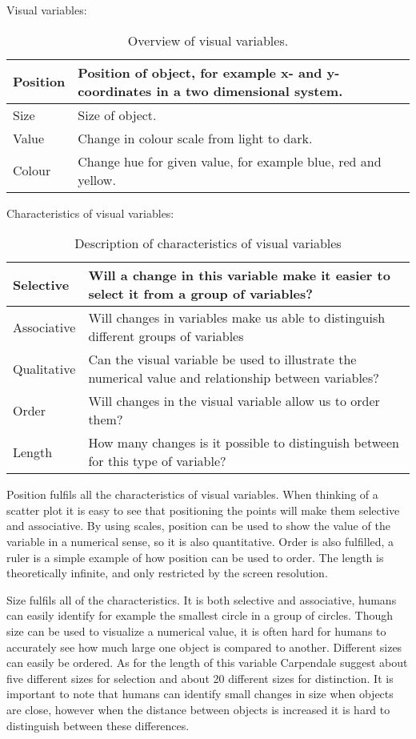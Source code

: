 Visual variables:
\begin{table}[h!]
    \begin{tabular}{|l|p{10cm}|}
        \hline
        Position    & Position of object, for example x- and y-coordinates in a two dimensional system. \\ \hline
        Size        & Size of object. \\ \hline
        Value       & Change in colour scale from light to dark. \\ \hline
        Colour      & Change hue for given value, for example blue, red and yellow. \\ \hline
    \end{tabular}
    \caption{Overview of visual variables.}
\end{table}

Characteristics of visual variables:
\begin{table}[h!]
    \begin{tabular}{|l|p{10cm}|}
        \hline
        Selective   & Will a change in this variable make it easier to select it from a group of variables? \\ \hline
        Associative & Will changes in variables make us able to distinguish different groups of variables \\ \hline 
        Qualitative & Can the visual variable be used to illustrate the numerical value and relationship between variables? \\ \hline
        Order       & Will changes in the visual variable allow us to order them? \\ \hline
        Length      & How many changes is it possible to distinguish between for this type of variable? \\ \hline
    \end{tabular}
    \caption{Description of characteristics of visual variables}
\end{table}

Position fulfils all the characteristics of visual variables. When thinking of a scatter plot it is easy to see that positioning the points will make them selective and associative. By using scales, position can be used to show the value of the variable in a numerical sense, so it is also quantitative. Order is also fulfilled, a ruler is a simple example of how position can be used to order. The length is theoretically infinite, and only restricted by the screen resolution.

Size fulfils all of the characteristics. It is both selective and associative, humans can easily identify for example the smallest circle in a group of circles. Though size can be used to visualize a numerical value, it is often hard for humans to accurately see how much large one object is compared to another. Different sizes can easily be ordered. As for the length of this variable Carpendale suggest about five different sizes for selection and about 20 different sizes for distinction. It is important to note that humans can identify small changes in size when objects are close, however when the distance between objects is increased it is hard to distinguish between these differences.

